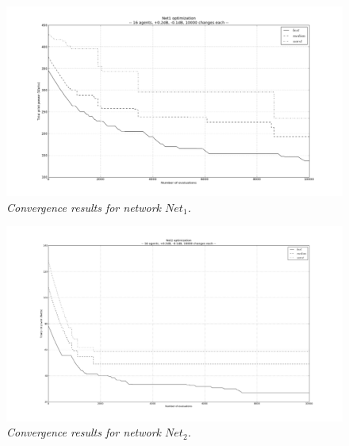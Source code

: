 \begin{figure}
\centering

\includegraphics[width=1\textwidth]{06-experimental_evaluation-service_coverage/img/convergence_1}

\caption{\textit{Convergence results for network $Net_{1}$.\label{fig:convergence_net1}}}
\end{figure}


\begin{figure}
\centering

\includegraphics[width=1\textwidth]{06-experimental_evaluation-service_coverage/img/convergence_2}

\caption{\textit{Convergence results for network $Net_{2}$.\label{fig:convergence_net2}}}
\end{figure}


